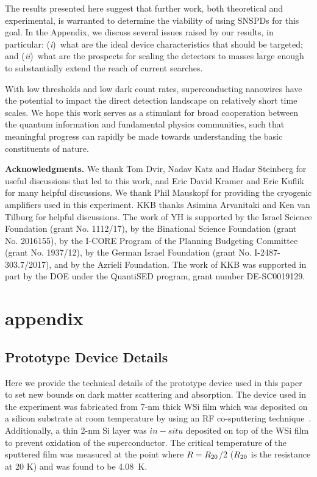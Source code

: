 \documentclass[twocolumn,10pt,prl,nofootinbib,preprintnumbers]{revtex4-1}
\def\mysections#1{{\bf #1.} }
\begin{document}
The results presented here suggest that
further work, both theoretical and experimental, is warranted to
determine the viability of using SNSPDs for this goal.  In
the Appendix, we discuss several issues raised by our
results, in particular: ({\it i})~what are the ideal device
characteristics that should be targeted; and ({\it ii})~what are the
prospects for scaling the detectors to masses large enough to
substantially extend the reach of current searches.

With low thresholds and low dark count rates, superconducting
nanowires have the potential to impact the direct detection landscape
on relatively short time scales. We hope this work serves as a
stimulant for broad cooperation between the quantum information and
fundamental physics communities, such that meaningful progress can
rapidly be made towards understanding the basic constituents of
nature.

\mysections{Acknowledgments} We thank Tom Dvir, Nadav Katz and Hadar
Steinberg for useful discussions that led to this work, and Eric David
Kramer and Eric Kuflik for many helpful discussions. We thank Phil
Mauskopf for providing the cryogenic amplifiers used in this
experiment. KKB thanks Asimina Arvanitaki and Ken van Tilburg for
helpful discussions. The work of YH is supported by the Israel Science
Foundation (grant No. 1112/17), by the Binational Science Foundation
(grant No. 2016155), by the I-CORE Program of the Planning Budgeting
Committee (grant No. 1937/12), by the German Israel Foundation (grant
No. I-2487-303.7/2017), and by the Azrieli Foundation. The work of KKB
was supported in part by the DOE under the QuantiSED program, grant
number DE-SC0019129.


\section{appendix}
%

\subsection{Prototype Device Details}
%

Here we provide the technical details of the prototype device used in this paper to set new bounds on dark matter scattering and
absorption. The device used in the experiment was fabricated
from 7-nm thick WSi film which was deposited on a silicon substrate at
room temperature by using an RF co-sputtering
technique~\cite{Baeka2011}. Additionally, a thin 2-nm Si layer was
$in-situ$ deposited on top of the WSi film to prevent oxidation of the
superconductor.  The critical temperature of the sputtered film was
measured at the point where $R = R_{\rm 20}$/2 ($R_{\rm 20}$ is the resistance at 20 K)  and was found to be
4.08~K. 
\end{document}
